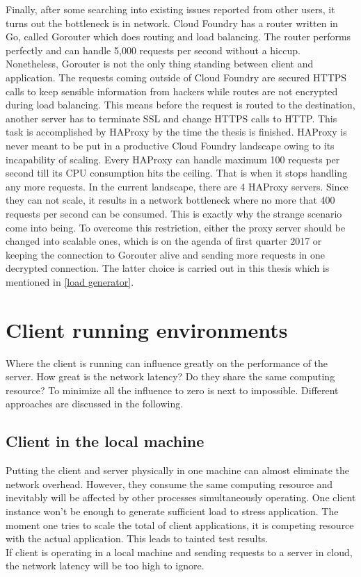 Finally, after some searching into existing issues reported from other users, it turns out the bottleneck is in network. Cloud Foundry has a router written in Go, called Gorouter  \citep{Gorouter} which does routing and load balancing. The router performs perfectly and can handle 5,000 requests per second without a hiccup. Nonetheless, Gorouter is not the only thing standing between client and application. The requests coming outside of Cloud Foundry are secured HTTPS calls to keep sensible information from hackers while routes are not encrypted during load balancing. This means before the request is routed to the destination, another server has to terminate SSL and change HTTPS calls to HTTP. This task is accomplished by \ac{HAProxy} \citep{HAProxy} by the time the thesis is finished. HAProxy is never meant to be put in a productive Cloud Foundry landscape owing to its incapability of scaling. Every HAProxy can handle maximum 100 requests per second till its CPU consumption hits the ceiling. That is when it stops handling any more requests. In the current landscape, there are 4 HAProxy servers. Since they can not scale, it results in a network bottleneck where no more that 400 requests per second can be consumed. This is exactly why the strange scenario come into being. To overcome this restriction, either the proxy server should be changed into scalable ones, which is on the agenda of first quarter 2017 or keeping the connection to Gorouter alive and sending more requests in one decrypted connection. The latter choice is carried out in this thesis which is mentioned in \ref{load generator}.


\section{ Client running environments}
Where the client is running can influence greatly on the performance of the server. How great is the network latency? Do they share the same computing resource? To minimize all the influence to zero is next to impossible. Different approaches are discussed in the following. 

\subsection{Client in the local machine }
Putting the client and server physically in one machine can almost eliminate the network overhead. However, they consume the same computing resource and inevitably will be affected by other processes simultaneously operating. One client instance won't be enough to generate sufficient load to stress application. The moment one tries to scale the total of client applications, it is competing resource with the actual application. This leads to tainted test results. \\ 
If client is operating in a local machine and sending requests to a server in cloud, the network latency will be too high to ignore.  

